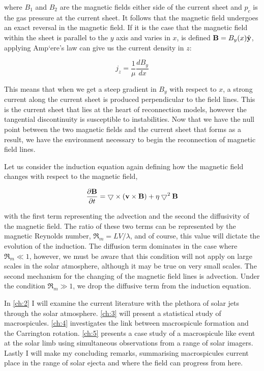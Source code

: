 \noindent where $B_1$ and $B_2$ are the magnetic fields either side of the current sheet and $p_c$ is the gas pressure at the current sheet.
It follows that the magnetic field undergoes an exact reversal in the magnetic field.
If it is the case that the magnetic field within the sheet is parallel to the $y$ axis and varies in $x$, is defined $\mathbf{B} = B_y(x)\hat{\mathbf{y}}$, applying Amp{`e}re's law can give us the current density in $z$:

\begin{equation}
	j_z = \frac{1}{\mu}\frac{dB_y}{dx}
\end{equation}

\noindent This means that when we get a steep gradient in $B_y$ with respect to $x$, a strong current along the current sheet is produced perpendicular to the field lines.
This is the current sheet that lies at the heart of reconnection models, however the tangential discontinuity is susceptible to instabilities.
Now that we have the null point between the two magnetic fields and the current sheet that forms as a result, we have the environment necessary to begin the reconnection of magnetic field lines.

Let us consider the induction equation again defining how the magnetic field changes with respect to the magnetic field,

\begin{equation}
	\frac{\partial \mathbf{B}}{\partial t } = \bigtriangledown \times (\mathbf{v} \times \mathbf{B}) + \eta\bigtriangledown^2\mathbf{B}
\end{equation} 

\noindent with the first term representing the advection and the second the diffusivity of the magnetic field.
The ratio of these two terms can be represented by the magnetic Reynolds number, $\Re_m = LV/\lambda$, and of course, this value will dictate the evolution of the induction.
The diffusion term dominates in the case where $\Re_m \ll 1$, however, we must be aware that this condition will not apply on large scales in the solar atmosphere, although it may be true on very small scales.
The second mechanism for the changing of the magnetic field lines is advection. 
Under the condition $\Re_m \gg 1$, we drop the diffusive term from the induction equation.


In \cref{ch:2} I will examine the current literature with the plethora of solar jets through the solar atmosphere.
\cref{ch:3} will present a statistical study of macrospicules.
\cref{ch:4} investigates the link between macrospicule formation and the Carrington rotation.
\cref{ch:5} presents a case study of a macrospicule like event at the solar limb using simultaneous observations from a range of solar imagers.
Lastly I will make my concluding remarks, summarising macrospicules current place in the range of solar ejecta and where the field can progress from here. 






